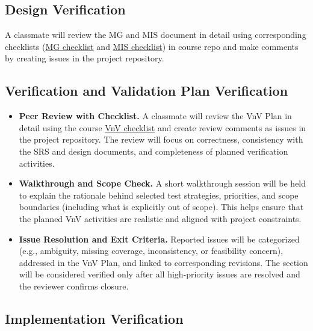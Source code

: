 \documentclass[12pt, titlepage]{article}
\begin{document}
\subsection{Design Verification}


A classmate will review the MG and MIS document in detail using corresponding checklists (\href{https://zhangwenchili.github.io/CAS741-EelbrainPipeline/Checklists/MG-Checklist.pdf}{MG checklist} and \href{https://zhangwenchili.github.io/CAS741-EelbrainPipeline/Checklists/MIS-Checklist.pdf}{MIS checklist}) in course repo and make comments by creating issues in the project repository.




\subsection{Verification and Validation Plan Verification}


\begin{itemize}
    \item \textbf{Peer Review with Checklist.} A classmate will review the VnV Plan in detail using the course \href{https://zhangwenchili.github.io/CAS741-EelbrainPipeline/Checklists/VnV-Checklist.pdf}{VnV checklist} and create review comments as issues in the project repository. The review will focus on correctness, consistency with the SRS and design documents, and completeness of planned verification activities.
    \item \textbf{Walkthrough and Scope Check.} A short walkthrough session will be held to explain the rationale behind selected test strategies, priorities, and scope boundaries (including what is explicitly out of scope). This helps ensure that the planned VnV activities are realistic and aligned with project constraints.
    \item \textbf{Issue Resolution and Exit Criteria.} Reported issues will be categorized (e.g., ambiguity, missing coverage, inconsistency, or feasibility concern), addressed in the VnV Plan, and linked to corresponding revisions. The section will be considered verified only after all high-priority issues are resolved and the reviewer confirms closure.
\end{itemize}




\subsection{Implementation Verification}
\end{document}

